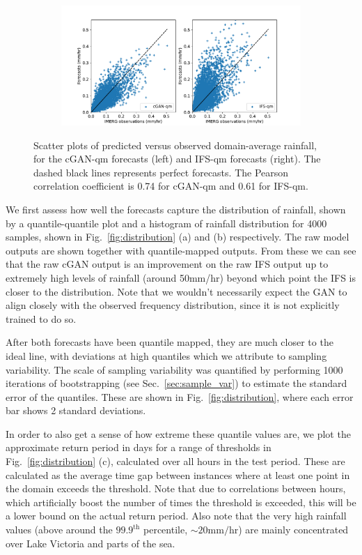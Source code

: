 \documentclass{article}
\begin{document}
\begin{figure}
\centering
     \begin{subfigure}{\textwidth}
    \centering
     \includegraphics[width=\textwidth]{images/scatter_mean_final-nologs_217600.pdf}
     \caption{}
     \end{subfigure}
     \caption{Scatter plots of predicted versus observed domain-average rainfall, for the cGAN-qm forecasts (left) and IFS-qm forecasts (right). The dashed black lines represents perfect forecasts. The Pearson correlation coefficient is 0.74 for cGAN-qm and 0.61 for IFS-qm.}
     \label{fig:bias}
\end{figure}

 We first assess how well the forecasts capture the distribution of rainfall, shown by a quantile-quantile plot and a histogram of rainfall distribution for 4000 samples, shown in Fig.~\ref{fig:distribution} (a) and (b) respectively. The raw model outputs are shown together with quantile-mapped outputs. From these we can see that the raw cGAN output is an improvement on the raw IFS output up to extremely high levels of rainfall (around 50mm/hr) beyond which point the IFS is closer to the distribution. Note that we wouldn't necessarily expect the GAN to align closely with the observed frequency distribution, since it is not explicitly trained to do so.

After both forecasts have been quantile mapped, they are much closer to the ideal line, with deviations at high quantiles which we attribute to sampling variability. The scale of sampling variability was quantified by performing 1000 iterations of bootstrapping (see Sec.~\ref{sec:sample_var}) to estimate the standard error of the quantiles. These are shown in Fig.~\ref{fig:distribution}, where each error bar shows 2 standard deviations.


In order to also get a sense of how extreme these quantile values are, we plot the approximate return period in days for a range of thresholds in Fig.~\ref{fig:distribution} (c), calculated over all hours in the test period. These are calculated as the average time gap between instances where at least one point in the domain exceeds the threshold. Note that due to correlations between hours, which artificially boost the number of times the threshold is exceeded, this will be a lower bound on the actual return period. Also note that the very high rainfall values (above around the $99.9^{\text{th}}$ percentile, $\sim20\text{mm/hr}$) are mainly concentrated over Lake Victoria and parts of the sea. 
\end{document}
